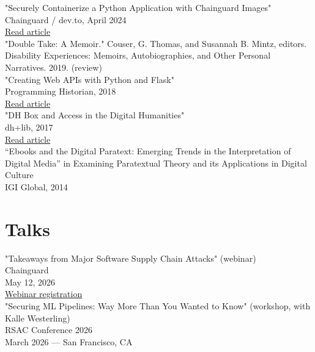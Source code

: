 \documentclass[11pt]{article}
\begin{document}
"Securely Containerize a Python Application with Chainguard Images"\\[0pt]
Chainguard / dev.to, April 2024\\[0pt]
\href{https://dev.to/chainguard/securely-containerize-a-python-application-with-chainguard-images-bn8}{Read article}\\[0pt]

"Double Take: A Memoir." Couser, G. Thomas, and Susannah B. Mintz, editors. Disability Experiences: Memoirs, Autobiographies, and Other Personal Narratives. 2019. (review)\\[0pt]

"Creating Web APIs with Python and Flask"\\[0pt]
Programming Historian, 2018\\[0pt]
\href{https://programminghistorian.org/lessons/creating-apis-with-python-and-flask}{Read article}\\[0pt]

"DH Box and Access in the Digital Humanities"\\[0pt]
dh+lib, 2017\\[0pt]
\href{http://acrl.ala.org/dh/2017/06/21/dh-box-and-access-in-the-digital-humanities/}{Read article}\\[0pt]

“Ebooks and the Digital Paratext: Emerging Trends in the Interpretation of Digital Media” in Examining Paratextual Theory and its Applications in Digital Culture\\[0pt]
IGI Global, 2014\\[0pt]


\section*{Talks}
\label{sec:org9e9a57e}

"Takeaways from Major Software Supply Chain Attacks" (webinar)\\[0pt]
Chainguard\\[0pt]
May 12, 2026\\[0pt]
\href{https://chainguard.registration.goldcast.io/webinar/92f51147-f099-4efb-8247-4410a2847355}{Webinar registration}\\[0pt]

"Securing ML Pipelines: Way More Than You Wanted to Know" (workshop, with Kalle Westerling)\\[0pt]
RSAC Conference 2026\\[0pt]
March 2026 — San Francisco, CA\\[0pt]
\end{document}
